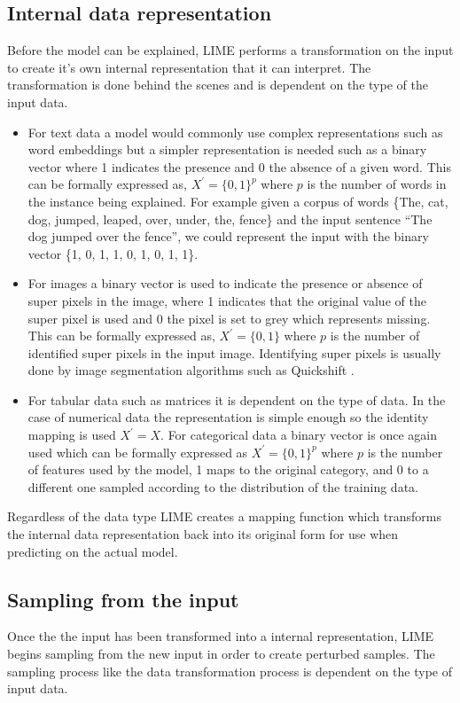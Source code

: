 \subsection{Internal data representation}Before the model can be explained, LIME performs a transformation on the input to create it's own internal representation that it can interpret. The transformation is done behind the scenes and is dependent on the type of the input data.

\begin{itemize}
\item For text data a model would commonly use complex representations such as word embeddings but a simpler representation is needed such as a binary vector where 1 indicates the presence and 0 the absence of a given word. This can be formally expressed as, 
$X^{'}={\{0,1\}}^{p}$ where $p$ is the number of words in the instance being explained. For example given a corpus of words \{The, cat, dog, jumped, leaped, over, under, the, fence\} and the input sentence  ``The dog jumped over the fence'', we could represent the input with the binary vector \{1, 0, 1, 1, 0, 1, 0, 1, 1\}.

\item For images a binary vector is used to indicate the presence or absence of super pixels in the image, where 1 indicates that the original value of the super pixel is used and 0 the pixel is set to grey which represents missing. This can be formally expressed as, $X^{'} = {\{0,1\}}$ where $p$ is the number of identified super pixels in the input image. Identifying super pixels is usually done by image segmentation algorithms such as Quickshift \cite{10.1007/978-3-540-88693-8_52}.

\item For tabular data such as matrices it is dependent on the type of data. In the case of numerical data the representation is simple enough so the identity mapping is used $X^{'} = X$. For categorical data a binary vector is once again used which can be formally expressed as $X^{'}={\{0,1\}^{p}}$ where $p$ is the number of features used by the model, 1 maps to the original category, and 0 to a different one sampled according to the distribution of the training data.
\end{itemize}
Regardless of the data type LIME creates a mapping function which transforms the internal data representation back into its original form for use when predicting on the actual model.

\subsection{Sampling from the input} Once the the input has been transformed into a internal representation, LIME begins sampling from the new input in order to create perturbed samples. The sampling process like the data transformation process is dependent on the type of input data.

